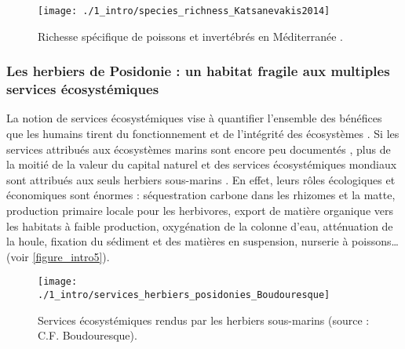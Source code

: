 \begin{figure}[H]
	\begin{center}
	\texttt{[image: ./1\_intro/species\_richness\_Katsanevakis2014]}
		\caption[Richesse spécifique de poissons et invertébrés en Méditerranée]{Richesse spécifique de poissons et invertébrés en Méditerranée \citep{katsanevakis_invading_2014}.}
	\label{figure_intro4}
\end{center}
\end{figure}

\subsubsection{Les herbiers de Posidonie : un habitat fragile aux multiples services écosystémiques}\label{intro.1.3.1}

La notion de services écosystémiques vise à quantifier l’ensemble des bénéfices que les humains tirent du fonctionnement et de l’intégrité des écosystèmes \citep{de_groot_global_2012}. Si les services attribués aux écosystèmes marins sont encore peu documentés \citep{townsend_challenge_2018}, plus de la moitié de la valeur du capital naturel et des services écosystémiques mondiaux sont attribués aux seuls herbiers sous-marins \citep{millenium_ecosystem_assessment_ecosystem_2005, ipbes_global_2019}. En effet, leurs rôles écologiques et économiques sont énormes : séquestration carbone dans les rhizomes et la matte, production primaire locale pour les herbivores, export de matière organique vers les habitats à faible production, oxygénation de la colonne d’eau, atténuation de la houle, fixation du sédiment et des matières en suspension, nurserie à poissons… (voir \autoref{figure_intro5}).

\begin{figure}[H]
	\begin{center}
	\texttt{[image: ./1\_intro/services\_herbiers\_posidonies\_Boudouresque]}
		\caption[Services écosystémiques rendus par les herbiers sous-marins]{Services écosystémiques rendus par les herbiers sous-marins (source : C.F. Boudouresque).}
	\label{figure_intro5}
\end{center}
\end{figure}

